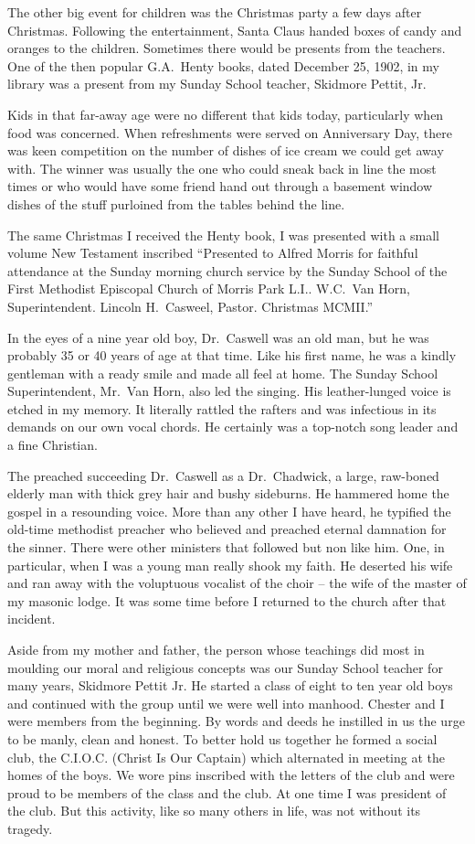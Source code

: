 \documentclass[12pt]{book}              %
\begin{document}
The other big event for children was the Christmas party a few days after Christmas. Following the entertainment, Santa Claus handed boxes of candy and oranges to the children. Sometimes there would be presents from the teachers. One of the then popular G.A.~Henty books, dated December 25, 1902, in my library was a present from my Sunday School teacher, Skidmore Pettit, Jr. 

Kids in that far-away age were no different that kids today, particularly when food was concerned. When refreshments were served on Anniversary Day, there was keen competition on the number of dishes of ice cream we could get away with. The winner was usually the one who could sneak back in line the most times or who would have some friend hand out through a basement window dishes of the stuff purloined from the tables behind the line. 

The same Christmas I received the Henty book, I was presented with a small volume New Testament inscribed ``Presented to Alfred Morris for faithful attendance at the Sunday morning church service by the Sunday School of the First Methodist Episcopal Church of Morris Park L.I.. W.C.~Van Horn, Superintendent. Lincoln H.~Casweel, Pastor. Christmas MCMII.'' 

In the eyes of a nine year old boy, Dr.~Caswell was an old man, but he was probably 35 or 40 years of age at that time. Like his first name, he was a kindly gentleman with a ready smile and made all feel at home. The Sunday School Superintendent, Mr.~Van Horn, also led the singing. His leather-lunged voice is etched in my memory. It literally rattled the rafters and was infectious in its demands on our own vocal chords. He certainly was a top-notch song leader and a fine Christian. 

The preached succeeding Dr.~Caswell as a Dr.~Chadwick, a large, raw-boned elderly man with thick grey hair and bushy sideburns. He hammered home the gospel in a resounding voice. More than any other I have heard, he typified the old-time methodist preacher who believed and preached eternal damnation for the sinner. There were other ministers that followed but non like him. One, in particular, when I was a young man really shook my faith. He deserted his wife and ran away with the voluptuous vocalist of the choir -- the wife of the master of my masonic lodge. It was some time before I returned to the church after that incident. 

Aside from my mother and father, the person whose teachings did most in moulding our moral and religious concepts was our Sunday School teacher for many years, Skidmore Pettit Jr. He started a class of eight to ten year old boys and continued with the group until we were well into manhood. Chester and I were members from the beginning. By words and deeds he instilled in us the urge to be manly, clean and honest. To better hold us together he formed a social club, the C.I.O.C. (Christ Is Our Captain) which alternated in meeting at the homes of the boys. We wore pins inscribed with the letters of the club and were proud to be members of the class and the club. At one time I was president of the club. But this activity, like so many others in life, was not without its tragedy. 
\end{document}
